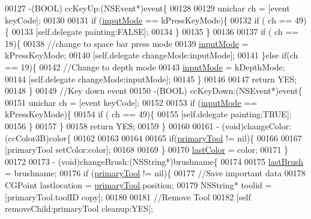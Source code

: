 \begin{DoxyCode}
00127 -(BOOL) ccKeyUp:(NSEvent*)event\{
00128 
00129     unichar ch = [event keyCode];
00130 
00131     \textcolor{keywordflow}{if} (\hyperlink{interface_h_u_d_layer_a1e506792d581032644d75804beb359a7}{inputMode} == kPressKeyMode)\{
00132         \textcolor{keywordflow}{if} ( ch == 49)\{
00133             [\textcolor{keyword}{self}.delegate painting:FALSE];
00134         \}
00135     \}
00136     
00137     \textcolor{keywordflow}{if} ( ch == 18)\{
00138         \textcolor{comment}{//change to space bar press mode}
00139         \hyperlink{interface_h_u_d_layer_a1e506792d581032644d75804beb359a7}{inputMode} = kPressKeyMode;
00140         [\textcolor{keyword}{self}.delegate changeMode:inputMode];
00141     \}\textcolor{keywordflow}{else} \textcolor{keywordflow}{if}(ch == 19)\{
00142         \textcolor{comment}{//Change to depth mode}
00143         \hyperlink{interface_h_u_d_layer_a1e506792d581032644d75804beb359a7}{inputMode} = kDepthMode;
00144         [\textcolor{keyword}{self}.delegate changeMode:inputMode];
00145     \}
00146     
00147     \textcolor{keywordflow}{return} YES;
00148 \}
00149 \textcolor{comment}{//Key down event}
00150 -(BOOL) ccKeyDown:(NSEvent*)event\{
00151     unichar ch = [event keyCode];
00152     
00153     \textcolor{keywordflow}{if} (\hyperlink{interface_h_u_d_layer_a1e506792d581032644d75804beb359a7}{inputMode} == kPressKeyMode)\{
00154         \textcolor{keywordflow}{if} ( ch == 49)\{
00155             [\textcolor{keyword}{self}.delegate painting:TRUE];
00156         \}
00157     \}
00158     \textcolor{keywordflow}{return} YES;
00159 \}
00160 
00161 - (void)changeColor:(ccColor3B)color\{
00162     
00163 
00164 
00165     \textcolor{keywordflow}{if}(\hyperlink{interface_h_u_d_layer_aad9b0e2b4164986e18ea0a9afcd1a914}{primaryTool} != nil)\{
00166         
00167         [primaryTool setColor:color];
00168 
00169     \}
00170     \hyperlink{interface_h_u_d_layer_a2d27bf64876ea6f0b2f0d1b9013c1cd7}{lastColor} = color;
00171 \}
00172 
00173 - (void)changeBrush:(NSString*)brushname\{
00174     
00175     \hyperlink{interface_h_u_d_layer_ad7cb8a30419241ee8d2f2813031191be}{lastBrush} = brushname;
00176     \textcolor{keywordflow}{if} (\hyperlink{interface_h_u_d_layer_aad9b0e2b4164986e18ea0a9afcd1a914}{primaryTool} != nil)\{
00177         \textcolor{comment}{//Save important data}
00178         CGPoint lastlocation = \hyperlink{interface_h_u_d_layer_aad9b0e2b4164986e18ea0a9afcd1a914}{primaryTool}.position;
00179         NSString* toolid = [primaryTool.toolID copy];
00180         
00181         \textcolor{comment}{//Remove Tool}
00182         [\textcolor{keyword}{self} removeChild:primaryTool cleanup:YES];

\end{DoxyCode}

